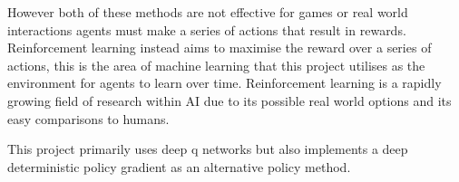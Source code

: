 However both of these methods are not effective for games or real world interactions agents must make a series of
actions that result in rewards. Reinforcement learning instead aims to maximise the reward over a series of actions,
this is the area of machine learning that this project utilises as the environment for agents to learn over time.
Reinforcement learning is a rapidly growing field of research within AI due to its possible real world options and
its easy comparisons to humans.


This project primarily uses deep q networks but also implements a deep deterministic policy gradient as an alternative
policy method.
